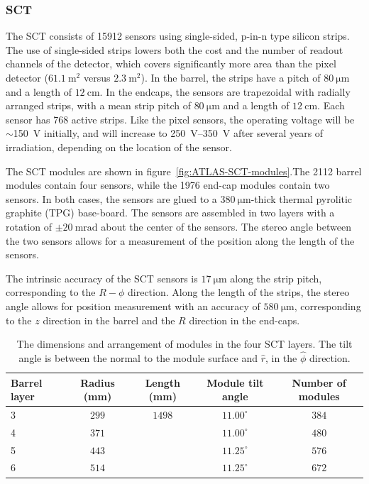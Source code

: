 \subsubsection{SCT}\label{sec:ATLAS-id-sct}

The SCT consists of 15912 sensors using single-sided, p-in-n type silicon strips. The use of single-sided strips lowers both the cost and the number of readout channels of the detector, which covers significantly more area than the pixel detector ($\SI{61.1}{\meter\tothe{2}}$ versus $\SI{2.3}{\meter\tothe{2}}$). In the barrel, the strips have a pitch of $\SI{80}{\micro\meter}$ and a length of $\SI{12}{\centi\meter}$. In the endcaps, the sensors are trapezoidal with radially arranged strips, with a mean strip pitch of $\SI{80}{\micro\meter}$ and a length of $\SI{12}{\centi\meter}$. Each sensor has 768 active strips. Like the pixel sensors, the operating voltage will be $\sim$\SI{150}{\volt} initially, and will increase to \SIrange[range-phrase=-]{250}{350}{\volt} after several years of irradiation, depending on the location of the sensor. 

The SCT modules are shown in figure~\ref{fig:ATLAS-SCT-modules}.The 2112 barrel modules contain four sensors, while the 1976 end-cap modules contain two sensors. In both cases, the sensors are glued to a $\SI{380}{\micro\meter}$-thick thermal pyrolitic graphite (TPG) base-board. The sensors are assembled in two layers with a rotation of $\pm\SI{20}{\milli\radian}$ about the center of the sensors. The stereo angle between the two sensors allows for a measurement of the position along the length of the sensors. 


The intrinsic accuracy of the SCT sensors is $\SI{17}{\micro\meter}$ along the strip pitch, corresponding to the $R-\phi$ direction. Along the length of the strips, the stereo angle allows for position measurement with an accuracy of $\SI{580}{\micro\meter}$, corresponding to the $z$ direction in the barrel and the $R$ direction in the end-caps.

\begin{table}[htbp]
	\centering
	\scriptsize
	\begin{tabular}{|l|c|c|c|c|}
		\hline
		\textbf{Barrel layer} & \textbf{Radius (mm)} & \textbf{Length (mm)} & \textbf{Module tilt angle} & \textbf{Number of modules} \\
		\hline
		3 & $299$ & $1498$ & $11.00^{\circ}$ & $384$ \\
		4 & $371$ & & $11.00^{\circ}$ & $480$ \\
		5 & $443$ & & $11.25^{\circ}$ & $576$ \\
		6 & $514$ & & $11.25^{\circ}$ & $672$ \\
		\hline
	\end{tabular}
	\caption{The dimensions and arrangement of modules in the four SCT layers. The tilt angle is between the normal to the module surface and $\hat{r}$, in the $\hat{\phi}$ direction.}
	\label{fig:ATLAS-SCT-layout}
\end{table}

